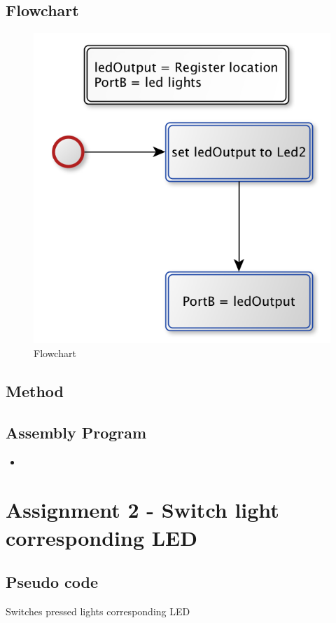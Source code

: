 \documentclass[a4paper, 12pt]{article}
\newcommand{\avrasm}[2]{
\begin{itemize}
\item[]
\end{itemize}
}
\begin{document}
\subsection{Flowchart}
\begin{figure}[h]
\centering
\includegraphics[scale=0.5]{Flowchart_pics/assignment1_pic.png} 
\caption{Flowchart}
\label{assign1.flow}
\end{figure}

\subsection{Method}


\newpage
\subsection{Assembly Program}
\avrasm{../src/a1.asm}{}
\newpage

\section{Assignment 2 - Switch light corresponding LED}


\subsection{Pseudo code}
\begin{algorithm}
\begin{algorithmic}
\Repeat
{} 
\Until{$\infty$}
\EndProcedure
\caption{Switches pressed lights corresponding LED}
\label{assign2.pseudo}
\end{algorithmic}
\end{algorithm}
\end{document}
